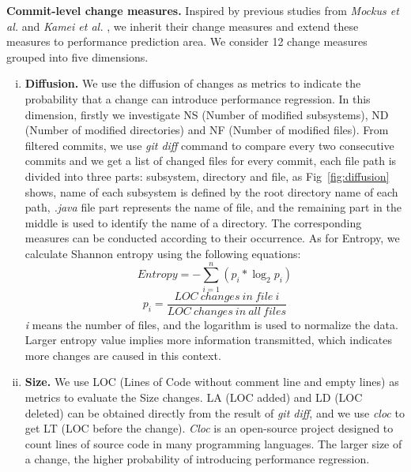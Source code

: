  \textbf{Commit-level change measures.} Inspired by previous studies from \textit{Mockus et al.} and \textit{Kamei et al.} \cite{mockus2000predicting}\cite{Kamei2013TSE}, we inherit their change measures and extend these measures to performance prediction area. We consider 12 change measures grouped into five dimensions.
\begin{enumerate}[(i)]
	\item \noindent
	\textbf{Diffusion.} We use the diffusion of changes as metrics to indicate the probability that a change can introduce performance regression. In this dimension, firstly we investigate NS (Number of modified subsystems), ND (Number of modified directories) and NF (Number of modified files). From filtered commits, we use \textit{git diff} command to compare every two consecutive commits and we get a list of changed files for every commit, each file path is divided into three parts: subsystem, directory and file, as Fig~\ref{fig:diffusion} shows, name of each subsystem is defined by the root directory name of each path, \textit{.java} file part represents the name of file, and the remaining part in the middle is used to identify the name of a directory. The corresponding measures can be conducted according to their occurrence. As for Entropy, we calculate Shannon entropy using the following equations:
	\begin{equation}
		Entropy = - \sum_{i=1}^{n}\left (p_{i}\ast \log_2 p_{i} \right )
	\end{equation}
	\begin{equation}
		p_{i} =\frac{LOC\ changes\ in\ file\ i}{LOC\ changes\ in\ all\ files}
	\end{equation}
	\textit{i} means the number of files, and the logarithm is used to normalize the data. Larger entropy value implies more information transmitted, which indicates more changes are caused in this context.
	
	\item \noindent
	\textbf{Size.}
	We use LOC (Lines of Code without comment line and empty lines) as metrics to evaluate the Size changes. LA (LOC added) and LD (LOC deleted) can be obtained directly from the result of \textit{git diff}, and we use \textit{cloc} to get LT (LOC before the change). \textit{Cloc} is an open-source project designed to count lines of source code in many programming languages. The larger size of a change,  the higher probability of introducing performance regression.
	

\end{enumerate}

